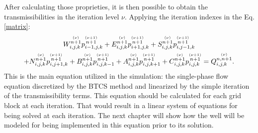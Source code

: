 \noindent
After calculating those proprieties, it is then possible to obtain the transmissibilities in the iteration level $\nu$. Applying the iteration indexes in the Eq. \ref{matrix}:
	\begin{multline}
	\label{matrix2}
	W^{\stackrel{(\nu)}{n+1}}_{i,j,k}p^{\stackrel{\Large{(\nu+1)}}{n+1}}_{i-1,j,k}+E^{\stackrel{(\nu)}{n+1}}_{i,j,k}p^{\stackrel{(\nu+1)}{n+1}}_{i+1,j,k}+S^{\stackrel{(\nu)}{n+1}}_{i,j,k}p^{\stackrel{(\nu+1)}{n+1}}_{i,j-1,k}\\+N^{\stackrel{(\nu)}{n+1}}_{i,j,k}p^{\stackrel{(\nu+1)}{n+1}}_{i,j+1,k}+B^{\stackrel{(\nu)}{n+1}}_{i,j,k}p^{\stackrel{(\nu+1)}{n+1}}_{i,j,k-1}+A^{\stackrel{(\nu)}{n+1}}_{i,j,k}p^{\stackrel{(\nu+1)}{n+1}}_{i,j,k+1}+C^{\stackrel{(\nu)}{n+1}}_{i,j,k}p^{\stackrel{(\nu+1)}{n+1}}_{i,j,k}=Q^{\stackrel{(\nu)}{n,n+1}}_{i,j,k}.
	\end{multline}
This is the main equation utilized in the simulation: the single-phase flow equation discretized by the BTCS method and linearized by the simple iteration of the transmissibility terms. This equation should be calculated for each grid block at each iteration. That would result in a linear system of equations for being solved at each iteration. The next chapter will show how the well will be modeled for being implemented in this equation prior to its solution.

